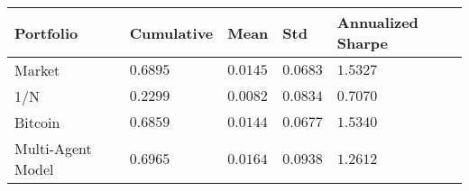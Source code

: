 \begin{tabularx}{\linewidth}{*{5}{X}}
\toprule
Portfolio & Cumulative & Mean & Std & Annualized Sharpe \\
\midrule
Market & $0.6895$ & $0.0145$ & $0.0683$ & $1.5327$\\
1/N & $0.2299$ & $0.0082$ & $0.0834$ & $0.7070$\\
Bitcoin & $0.6859$ & $0.0144$ & $0.0677$ & $1.5340$\\
Multi-Agent Model & $0.6965$ & $0.0164$ & $0.0938$ & $1.2612$\\
\bottomrule
\end{tabularx}

